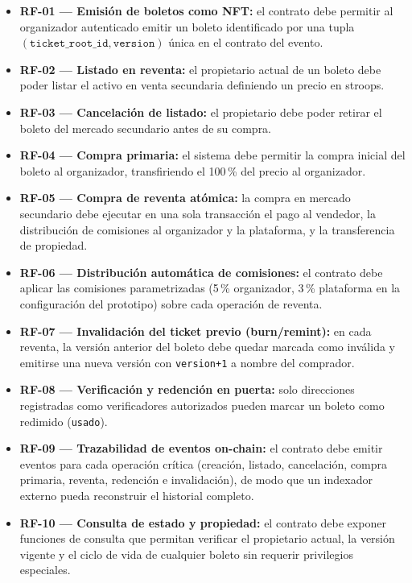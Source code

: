 \begin{itemize}
    \item \textbf{RF-01 — Emisión de boletos como NFT:} el contrato debe permitir al organizador autenticado emitir un boleto identificado por una tupla \((\texttt{ticket\_root\_id}, \texttt{version})\) única en el contrato del evento.
    \item \textbf{RF-02 — Listado en reventa:} el propietario actual de un boleto debe poder listar el activo en venta secundaria definiendo un precio en stroops.
    \item \textbf{RF-03 — Cancelación de listado:} el propietario debe poder retirar el boleto del mercado secundario antes de su compra.
    \item \textbf{RF-04 — Compra primaria:} el sistema debe permitir la compra inicial del boleto al organizador, transfiriendo el 100\,\% del precio al organizador.
    \item \textbf{RF-05 — Compra de reventa atómica:} la compra en mercado secundario debe ejecutar en una sola transacción el pago al vendedor, la distribución de comisiones al organizador y la plataforma, y la transferencia de propiedad.
    \item \textbf{RF-06 — Distribución automática de comisiones:} el contrato debe aplicar las comisiones parametrizadas (5\,\% organizador, 3\,\% plataforma en la configuración del prototipo) sobre cada operación de reventa.
    \item \textbf{RF-07 — Invalidación del ticket previo (burn/remint):} en cada reventa, la versión anterior del boleto debe quedar marcada como inválida y emitirse una nueva versión con \texttt{version+1} a nombre del comprador.
    \item \textbf{RF-08 — Verificación y redención en puerta:} solo direcciones registradas como verificadores autorizados pueden marcar un boleto como redimido (\texttt{usado}).
    \item \textbf{RF-09 — Trazabilidad de eventos on-chain:} el contrato debe emitir eventos para cada operación crítica (creación, listado, cancelación, compra primaria, reventa, redención e invalidación), de modo que un indexador externo pueda reconstruir el historial completo.
    \item \textbf{RF-10 — Consulta de estado y propiedad:} el contrato debe exponer funciones de consulta que permitan verificar el propietario actual, la versión vigente y el ciclo de vida de cualquier boleto sin requerir privilegios especiales.
\end{itemize}

